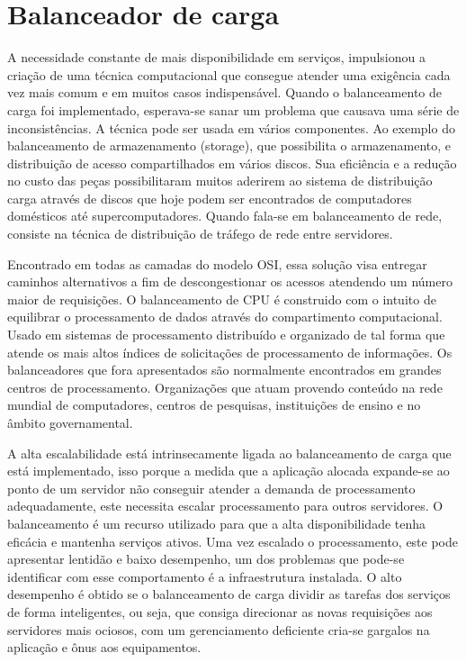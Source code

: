 \chapter{Balanceador de carga}


A necessidade constante de mais disponibilidade em serviços, impulsionou a criação de uma técnica computacional 
que consegue atender uma exigência cada vez mais comum e em muitos casos indispensável. Quando o balanceamento 
de carga foi implementado, esperava-se sanar um problema que causava uma série de inconsistências. A técnica pode
ser usada em vários componentes. Ao exemplo do balanceamento de armazenamento (storage), que possibilita o 
armazenamento, e distribuição de acesso compartilhados em vários discos. Sua eficiência e a redução no custo das 
peças possibilitaram muitos aderirem ao sistema de distribuição carga através de discos  que hoje podem ser 
encontrados de computadores domésticos até supercomputadores. Quando fala-se em balanceamento de rede, consiste 
na técnica de distribuição de tráfego de rede entre servidores.


Encontrado em todas as camadas do modelo OSI, essa solução visa entregar caminhos alternativos a fim de descongestionar
os acessos atendendo um número maior de requisições. O balanceamento de CPU é construido com o intuito de equilibrar o
processamento de dados através do compartimento computacional. Usado em sistemas de processamento distribuído e 
organizado de tal forma que atende os mais altos índices de solicitações de processamento de informações. Os 
balanceadores que fora apresentados são normalmente encontrados em grandes centros de processamento. Organizações 
que atuam provendo conteúdo na rede mundial de computadores, centros de pesquisas, instituições de ensino e no âmbito
governamental.


A alta escalabilidade está intrinsecamente ligada ao balanceamento de carga que está implementado, isso porque a medida 
que a aplicação alocada expande-se ao ponto de um servidor não conseguir atender a demanda de processamento adequadamente,
este necessita escalar processamento para outros servidores. O balanceamento é um recurso utilizado para que a alta
disponibilidade tenha eficácia e mantenha serviços ativos. Uma vez escalado o processamento, este pode apresentar lentidão
e baixo desempenho, um dos problemas que pode-se identificar com esse comportamento é a infraestrutura instalada. 
O alto desempenho é obtido se o balanceamento de carga dividir as tarefas dos serviços de forma inteligentes, ou seja, 
que consiga direcionar as novas requisições aos servidores mais ociosos, com um gerenciamento deficiente cria-se gargalos
na aplicação e ônus aos equipamentos.


